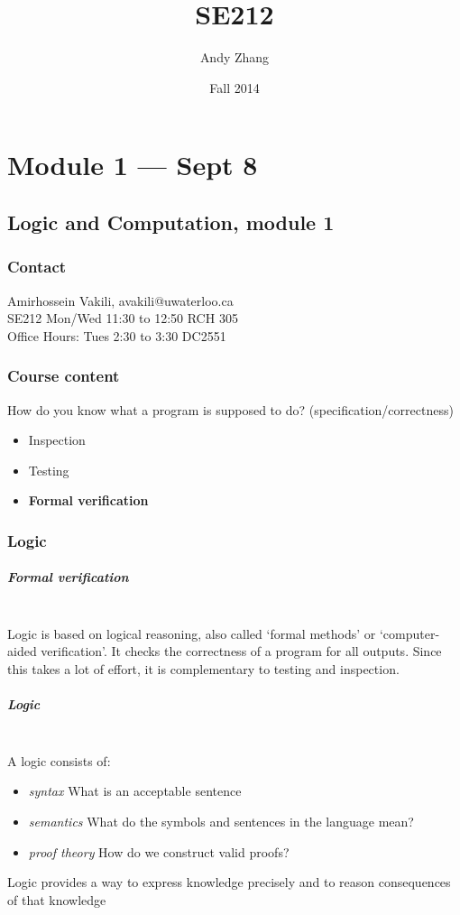 \documentclass[12pt]{report}
\title{SE212}
\author{{Andy Zhang}}
\date{{Fall 2014}}
\begin{document}
\maketitle
\tableofcontents
\chapter{Module 1 --- Sept 8}
  \section{Logic and Computation, module 1}
    \subsection{Contact}
      Amirhossein Vakili, avakili@uwaterloo.ca\\
      SE212 Mon/Wed 11:30 to 12:50 RCH 305\\
      Office Hours: Tues 2:30 to 3:30 DC2551

    \subsection{Course content}
      How do you know what a program is supposed to do?
      (specification/correctness)
      \begin{itemize}
        \item Inspection
        \item Testing
        \item \textbf{Formal verification}
      \end{itemize}

    \subsection{Logic}
      \paragraph{Formal verification} \hspace{0pt}~\\
      Logic is based on logical reasoning, also called `formal methods' or
      `computer-aided verification'. It checks the correctness of a program
      for all outputs. Since this takes a lot of effort, it is complementary to
      testing and inspection.

      \paragraph{Logic}  \hspace{0pt}~\\
      A logic consists of:
      \begin{itemize}
        \item \textit{syntax} \: What is an acceptable sentence
        \item \textit{semantics} \: What do the symbols and sentences in the
          language mean?
        \item \textit{proof theory} \: How do we construct valid proofs?
      \end{itemize}
      Logic provides a way to express knowledge precisely and to reason
      consequences of that knowledge
\end{document}
